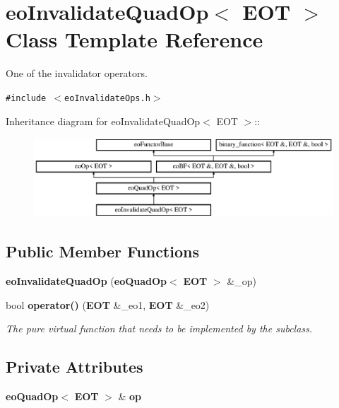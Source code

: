 \section{eo\-Invalidate\-Quad\-Op$<$ EOT $>$ Class Template Reference}
\label{classeo_invalidate_quad_op}
One of the invalidator operators.  


{\tt \#include $<$eo\-Invalidate\-Ops.h$>$}

Inheritance diagram for eo\-Invalidate\-Quad\-Op$<$ EOT $>$::\begin{figure}[H]
\begin{center}
\leavevmode
\includegraphics[height=2.96296cm]{classeo_invalidate_quad_op}
\end{center}
\end{figure}
\subsection*{Public Member Functions}
\begin{CompactItemize}
\item 
{\bf eo\-Invalidate\-Quad\-Op} ({\bf eo\-Quad\-Op}$<$ {\bf EOT} $>$ \&\_\-op)\label{classeo_invalidate_quad_op_a0}

\item 
bool {\bf operator()} ({\bf EOT} \&\_\-eo1, {\bf EOT} \&\_\-eo2)\label{classeo_invalidate_quad_op_a1}

\begin{CompactList}\small\item\em The pure virtual function that needs to be implemented by the subclass. \item\end{CompactList}\end{CompactItemize}
\subsection*{Private Attributes}
\begin{CompactItemize}
\item 
{\bf eo\-Quad\-Op}$<$ {\bf EOT} $>$ \& {\bf op}\label{classeo_invalidate_quad_op_r0}

\end{CompactItemize}


